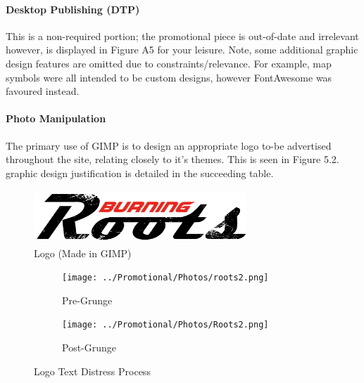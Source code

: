 \documentclass[11pt, english]{article}
\begin{document}
			\paragraph{Desktop Publishing (DTP)}

	This is a non-required portion; the promotional piece is out-of-date and irrelevant however, is displayed in Figure A5 for your leisure. Note, some additional graphic design features are omitted due to constraints/relevance. For example, map symbols were all intended to be custom designs, however FontAwesome was favoured instead.

			\paragraph{Photo Manipulation}

	The primary use of GIMP is to design an appropriate logo to-be advertised throughout the site, relating closely to it's themes. This is seen in Figure 5.2. graphic design justification is detailed in the succeeding table.

	\begin{figure}[H]
	\begin{center}
		\includegraphics[width=8cm,height=2cm]{../System/Photos/Logo.png}
		\caption{Logo (Made in GIMP)}
	\end{center}
	\end{figure}

	\begin{figure}[H]
	\begin{center}
		\begin{subfigure}[t]{6cm}
                \begin{center}
                        \texttt{[image: ../Promotional/Photos/roots2.png]}
                \end{center}
                        \caption{Pre-Grunge}
                \end{subfigure}
                \begin{subfigure}[t]{6cm}
                \begin{center}
                        \texttt{[image: ../Promotional/Photos/Roots2.png]}
                \end{center}
                        \caption{Post-Grunge}
                \end{subfigure}
		\caption{Logo Text Distress Process}
	\end{center}
	\end{figure}
\end{document}
